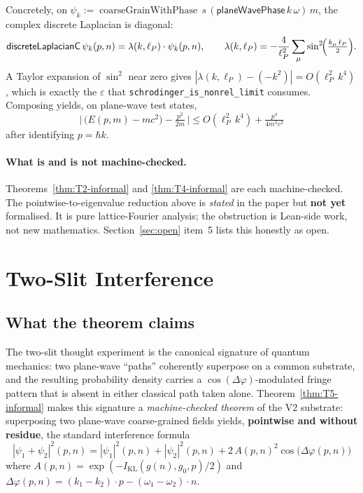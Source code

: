 \documentclass[11pt,a4paper,twoside]{article}
\theoremstyle{definition}
\newcommand{\KL}{I_{\mathrm{KL}}}
\newcommand{\lP}{\ell_P}
\newcommand{\coarseGrainWithPhase}{\operatorname{coarseGrainWithPhase}}
\newcommand{\code}[1]{\texttt{#1}}
\begin{document}
Concretely, on
$\psi_{k}:=\coarseGrainWithPhase\,s\,(\mathsf{planeWavePhase}\,k\,\omega)\,m$,
the complex discrete Laplacian is diagonal:
\[
\mathsf{discreteLaplacianC}\,\psi_{k}(p,n)=\lambda(k,\lP)\cdot\psi_{k}(p,n),
\qquad
\lambda(k,\lP)=-\frac{4}{\lP^{2}}\sum_{\mu}\sin^{2}\!\Bigl(\tfrac{k_{\mu}\,\lP}{2}\Bigr).
\]
A Taylor expansion of $\sin^{2}$ near zero gives
$|\lambda(k,\lP)-(-k^{2})|=O(\lP^{2}\,k^{4})$, which is exactly the
$\varepsilon$ that \code{schrodinger\_is\_nonrel\_limit} consumes.
Composing yields, on plane-wave test states,
\[
\bigl|\,\bigl(E(p,m)-mc^{2}\bigr)-\tfrac{p^{2}}{2m}\,\bigr|
 \le O(\lP^{2}\,k^{4})+\tfrac{p^{4}}{4m^{3}c^{2}}
\]
after identifying $p=\hbar k$.

\paragraph{What is and is not machine-checked.}
Theorems~\ref{thm:T2-informal} and \ref{thm:T4-informal} are each
machine-checked. The pointwise-to-eigenvalue reduction above is
\emph{stated} in the paper but \textbf{not yet} formalised. It is
pure lattice-Fourier analysis; the obstruction is Lean-side work, not
new mathematics. Section~\ref{sec:open} item~5 lists this honestly as
open.

\section{Two-Slit Interference}\label{sec:interference}

\subsection{What the theorem claims}\label{sec:interference-claim}

The two-slit thought experiment is the canonical signature of quantum
mechanics: two plane-wave ``paths'' coherently superpose on a common
substrate, and the resulting probability density carries a
$\cos(\Delta\varphi)$-modulated fringe pattern that is absent in
either classical path taken alone. Theorem~\ref{thm:T5-informal}
makes this signature a \emph{machine-checked theorem} of the V2
substrate: superposing two plane-wave coarse-grained fields yields,
\textbf{pointwise and without residue}, the standard interference
formula
\[
|\psi_{1}+\psi_{2}|^{2}(p,n)
 = |\psi_{1}|^{2}(p,n)+|\psi_{2}|^{2}(p,n)+2\,A(p,n)^{2}\cos\bigl(\Delta\varphi(p,n)\bigr)
\]
where $A(p,n)=\exp(-\KL(g(n),g_{0},p)/2)$ and
$\Delta\varphi(p,n)=(k_{1}-k_{2})\cdot p-(\omega_{1}-\omega_{2})\cdot n$.
\end{document}
